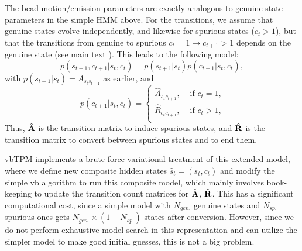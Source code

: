 The bead motion/emission parameters are exactly analogous to genuine
state parameters in the simple HMM above. For the transitions, we
assume that genuine states evolve independently, and likewise for
spurious states ($c_t>1$), but that the transitions from genuine to
spurious $c_t=1 \to c_{t+1}>1$ depends on the genuine state (see main
text \cite{vbTPMpaper}). This leads to the following model:
\begin{equation}
  p(s_{t+1},c_{t+1}|s_t,c_t)=p(s_{t+1}|s_t)p(c_{t+1}|s_t,c_t),
\end{equation}
with $p(s_{t+1}|s_t)=A_{s_ts_{t+1}}$ as earlier, and
\begin{equation}
  p(c_{t+1}|s_t,c_t)
  =\left\{
  \begin{array}{ll}
    \hat A_{s_tc_{t+1}},&\text{ if $c_t=1$,}\\
    \hat R_{c_tc_{t+1}},&\text{ if $c_t>1$,}\\
  \end{array}
  \right.
\end{equation}
Thus, $\hat{\mathbf{A}}$ is the transition matrix to induce spurious
states, and $\hat{\mathbf{R}}$ is the transition matrix to convert
between spurious states and to end them.

vbTPM implements a brute force variational treatment of this extended
model, where we define new composite hidden states $\hat
s_t=(s_t,c_t)$ and modify the simple vb algorithm to run this
composite model, which mainly involves book-keeping to update the
transition count matrices for $\hat{\mathbf{A}}$, $\hat{\mathbf{R}}$.
This has a significant computational cost, since a simple model with
$N_{gen.}$ genuine states and $N_{sp.}$ spurious ones gets
$N_{gen.}\times(1+N_{sp.})$ states after conversion. However, since we
do not perform exhaustive model search in this representation and can
utilize the simpler model to make good initial guesses, this is not a
big problem.

